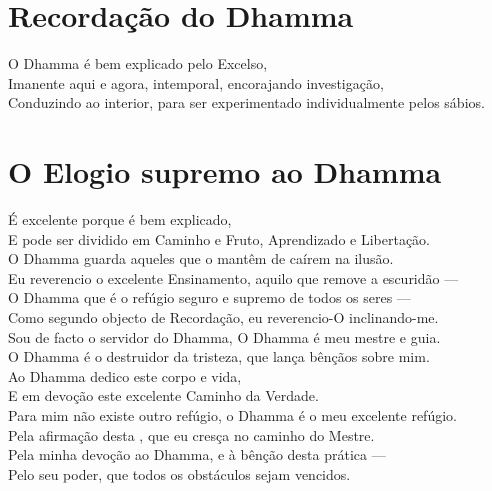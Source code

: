 \clearpage

\chapter{Recordação do Dhamma}

\begin{leader}
\end{leader}

O Dhamma é bem explicado pelo Excelso,\\
Imanente aqui e agora, intemporal, encorajando investigação,\\
Conduzindo ao interior, para ser experimentado individualmente pelos sábios.

\nextChapterUseDelegatedPageNumber

\chapter{O Elogio supremo ao Dhamma}

\begin{leader}
\end{leader}

É excelente porque é bem explicado,\\
E pode ser dividido em Caminho e Fruto, Aprendizado e Libertação.\\
O Dhamma guarda aqueles que o mantêm de caírem na ilusão.\\
Eu reverencio o excelente Ensinamento, aquilo que remove a escuridão ---\\
O Dhamma que é o refúgio seguro e supremo de todos os seres ---\\
Como segundo objecto de Recordação, eu reverencio-O inclinando-me.\\
Sou de facto o servidor do Dhamma, O Dhamma é meu mestre e guia.\\
O Dhamma é o destruidor da tristeza, que lança bênçãos sobre mim.\\
Ao Dhamma dedico este corpo e vida,\\
E em devoção  este excelente Caminho da Verdade.\\
Para mim não existe outro refúgio, o Dhamma é o meu excelente refúgio.\\
Pela afirmação desta , que eu cresça no caminho do Mestre.\\
Pela minha devoção ao Dhamma, e à bênção desta prática ---\\
Pelo seu poder, que todos os obstáculos sejam vencidos.

